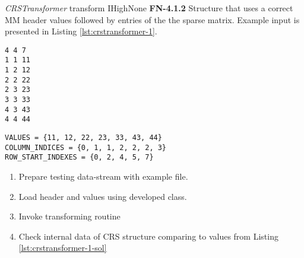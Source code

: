 \begin{testcase}{\emph{CRSTransformer} transform I}{High}{None}
		{
			\textbf{FN-4.1.2}
		}
		{
			Structure that uses a correct \gls{MM} header values followed by entries of the the sparse matrix. Example input is presented in Listing \ref{lst:crstransformer-1}. 	
		}
		\begin{lstlisting}[label={lst:crstransformer-1},
			    basicstyle=\small,caption={\gls{MM} format data example}, frame=single]
%%MatrixMarket matrix coordinate real general
4 4 7
1 1 11
1 2 12
2 2 22
2 3 23
3 3 33
4 3 43
4 4 44
		\end{lstlisting}
		\begin{lstlisting}[label={lst:crstransformer-1-sol},
		basicstyle=\small,caption={\gls{CRS} format internal data example}, frame=single]
VALUES = {11, 12, 22, 23, 33, 43, 44}
COLUMN_INDICES = {0, 1, 1, 2, 2, 2, 3}
ROW_START_INDEXES = {0, 2, 4, 5, 7}
		\end{lstlisting}
		{
			\begin{enumerate}
				\item Prepare testing data-stream with example file.
				\item Load header and values using developed class.
				\item Invoke transforming routine 
				\item
				{
					Check internal data of \gls{CRS} structure comparing to values from Listing \ref{lst:crstransformer-1-sol} 
				}
			\end{enumerate}
		}
	\end{testcase}

